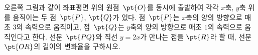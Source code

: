 \noindent\begin{minipage}[t]{0.58\linewidth}\vspace{0pt}\raggedright 오른쪽 그림과 같이 좌표평면 위의 원점~$\pt{O}$를 동시에 출발하여 각각 $x$축, $y$축 위를 움직이는 두 점~$\pt{P}$, $\pt{Q}$가 있다. 점~$\pt{P}$는 $x$축의 양의 방향으로 매초 $3$의 속력으로 움직이고, 점~$\pt{Q}$는 $y$축의 양의 방향으로 매초 $1$의 속력으로 움직인다고 한다. 선분~$\pt{PQ}$와 직선 $y=2x$가 만나는 점을 $\pt{R}$라 할 때, 선분~$\pt{OR}$의 길이의 변화율을 구하시오.\end{minipage}\hfill\begin{minipage}[t]{0.4\linewidth}\vspace{0pt}\centering \resizebox{\ifdim\width>\linewidth\linewidth\else\width\fi}{!}{}\end{minipage}\par
